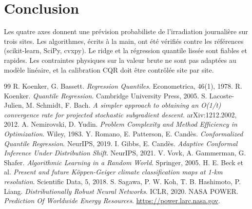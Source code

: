 \documentclass[11pt,a4paper]{article}
\theoremstyle{remark}
\theoremstyle{definition}
\begin{document}
\section{Conclusion}
Les quatre axes donnent une prévision probabiliste de l'irradiation journalière sur trois sites. Les algorithmes, écrits à la main, ont été vérifiés contre les
références (scikit-learn, SciPy, cvxpy). Le ridge et la régression quantile lissée sont fiables et rapides. Les contraintes physiques sur la valeur brute
ne sont pas adaptées au modèle linéaire, et la calibration CQR doit être contrôlée site par site.

\begin{thebibliography}{99}
 R. Koenker, G. Bassett. \emph{Regression Quantiles}. Econometrica, 46(1), 1978.
 R. Koenker. \emph{Quantile Regression}. Cambridge University Press, 2005.
 S. Lacoste-Julien, M. Schmidt, F. Bach. \emph{A simpler approach to obtaining an O(1/t) convergence rate for projected stochastic subgradient descent}. arXiv:1212.2002, 2012.
 A. Nemirovski, D. Yudin. \emph{Problem Complexity and Method Efficiency in Optimization}. Wiley, 1983.
 Y. Romano, E. Patterson, E. Candès. \emph{Conformalized Quantile Regression}. NeurIPS, 2019.
 I. Gibbs, E. Candès. \emph{Adaptive Conformal Inference Under Distribution Shift}. NeurIPS, 2021.
 V. Vovk, A. Gammerman, G. Shafer. \emph{Algorithmic Learning in a Random World}. Springer, 2005.
 H. E. Beck et al. \emph{Present and future Köppen-Geiger climate classification maps at 1-km resolution}. Scientific Data, 5, 2018.
 S. Sagawa, P. W. Koh, T. B. Hashimoto, P. Liang. \emph{Distributionally Robust Neural Networks}. ICLR, 2020.
 NASA POWER. \emph{Prediction Of Worldwide Energy Resources}. \url{https://power.larc.nasa.gov}.
\end{thebibliography}
\end{document}
